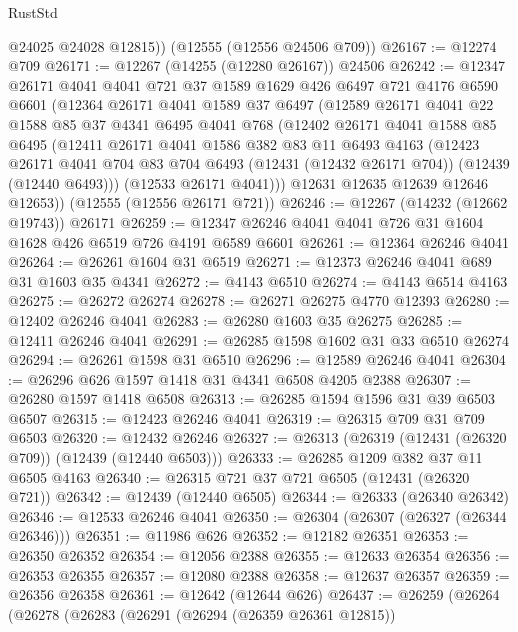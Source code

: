 \begin{lexlean}{RustStd}
\begin{coremodule}
        @24025
        @24028
        @12815))
    (@12555 (@12556 @24506 @709))
@26167 := @12274 @709
@26171 := @12267 (@14255 (@12280 @26167)) @24506
@26242 := @12347
    @26171
    @4041
    @4041
    @721
    @37
    @1589
    @1629
    @426
    @6497
    @721
    @4176
    @6590
    @6601
    (@12364
      @26171
      @4041
      @1589
      @37
      @6497
      (@12589
        @26171
        @4041
        @22
        @1588
        @85
        @37
        @4341
        @6495
        @4041
        @768
        (@12402
          @26171
          @4041
          @1588
          @85
          @6495
          (@12411
            @26171
            @4041
            @1586
            @382
            @83
            @11
            @6493
            @4163
            (@12423
              @26171
              @4041
              @704
              @83
              @704
              @6493
              (@12431 (@12432 @26171 @704))
              (@12439 (@12440 @6493)))
            (@12533 @26171 @4041)))
        @12631
        @12635
        @12639
        @12646
        @12653))
    (@12555 (@12556 @26171 @721))
@26246 := @12267 (@14232 (@12662 @19743)) @26171
@26259 := @12347 @26246 @4041 @4041 @726 @31 @1604 @1628 @426 @6519 @726 @4191 @6589 @6601
@26261 := @12364 @26246 @4041
@26264 := @26261 @1604 @31 @6519
@26271 := @12373 @26246 @4041 @689 @31 @1603 @35 @4341
@26272 := @4143 @6510
@26274 := @4143 @6514 @4163
@26275 := @26272 @26274
@26278 := @26271 @26275 @4770 @12393
@26280 := @12402 @26246 @4041
@26283 := @26280 @1603 @35 @26275
@26285 := @12411 @26246 @4041
@26291 := @26285 @1598 @1602 @31 @33 @6510 @26274
@26294 := @26261 @1598 @31 @6510
@26296 := @12589 @26246 @4041
@26304 := @26296 @626 @1597 @1418 @31 @4341 @6508 @4205 @2388
@26307 := @26280 @1597 @1418 @6508
@26313 := @26285 @1594 @1596 @31 @39 @6503 @6507
@26315 := @12423 @26246 @4041
@26319 := @26315 @709 @31 @709 @6503
@26320 := @12432 @26246
@26327 := @26313 (@26319 (@12431 (@26320 @709)) (@12439 (@12440 @6503)))
@26333 := @26285 @1209 @382 @37 @11 @6505 @4163
@26340 := @26315 @721 @37 @721 @6505 (@12431 (@26320 @721))
@26342 := @12439 (@12440 @6505)
@26344 := @26333 (@26340 @26342)
@26346 := @12533 @26246 @4041
@26350 := @26304 (@26307 (@26327 (@26344 @26346)))
@26351 := @11986 @626
@26352 := @12182 @26351
@26353 := @26350 @26352
@26354 := @12056 @2388
@26355 := @12633 @26354
@26356 := @26353 @26355
@26357 := @12080 @2388
@26358 := @12637 @26357
@26359 := @26356 @26358
@26361 := @12642 (@12644 @626)
@26437 := @26259
    (@26264
      (@26278
        (@26283
          (@26291
            (@26294 (@26359 @26361 @12815))

\end{coremodule}
\end{lexlean}
